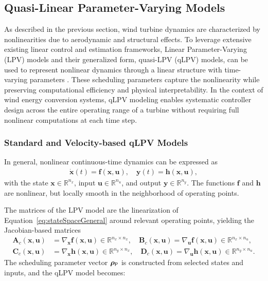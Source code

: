 \subsection{Quasi-Linear Parameter-Varying Models}
\label{sec:qLPVmodels}
As described in the previous section, wind turbine dynamics are characterized by nonlinearities due to aerodynamic and structural effects. To leverage extensive existing linear control and estimation frameworks, Linear Parameter-Varying (LPV) models and their generalized form, quasi-LPV (qLPV) models, can be used to represent nonlinear dynamics through a linear structure with time-varying parameters \cite{hoffmann2014survey}. These scheduling parameters capture the nonlinearity while preserving computational efficiency and physical interpretability. In the context of wind energy conversion systems, qLPV modeling enables systematic controller design across the entire operating range of a turbine without requiring full nonlinear computations at each time step.

\subsubsection{Standard and Velocity-based qLPV Models}
\label{sec:qLPVmodelTheory}

In general, nonlinear continuous-time dynamics can be expressed as
\begin{align} \label{eq:stateSpaceGeneral}
    \dot{\bm{x}}(t) = \bm{f}(\bm{x}, \bm{u}), \quad
    \bm{y}(t) = \bm{h}(\bm{x}, \bm{u}),
\end{align}
with the state $\bm{x} \in \mathbb{R}^{n_x}$, input $\bm{u} \in \mathbb{R}^{n_u }$, and output $\bm{y} \in \mathbb{R}^{n_y }$. The functions $\bm{f}$ and $\bm{h}$ are nonlinear, but locally smooth in the neighborhood of operating points.

The matrices of the LPV model are the linearization of Equation~\eqref{eq:stateSpaceGeneral} around relevant operating points, yielding the Jacobian-based matrices
\begin{equation}\label{eq:contMatricesqLPV}
    \begin{aligned}
        \bm{A}_c(\bm{x},\bm{u}) &= \nabla_{\bm{x}} \bm{f}(\bm{x},\bm{u}) \in \mathbb{R}^{n_x \times n_x}, \quad
        \bm{B}_c(\bm{x},\bm{u}) = \nabla_{\bm{u}} \bm{f}(\bm{x},\bm{u}) \in \mathbb{R}^{n_x \times n_u}, \\
        \bm{C}_c(\bm{x},\bm{u}) &= \nabla_{\bm{x}} \bm{h}(\bm{x},\bm{u}) \in \mathbb{R}^{n_y \times n_x}, \quad
        \bm{D}_c(\bm{x},\bm{u}) = \nabla_{\bm{u}} \bm{h}(\bm{x},\bm{u})\in \mathbb{R}^{n_y \times n_u}.
    \end{aligned}
\end{equation}
The scheduling parameter vector $\bm{\rho}_{\mathsf{P}}$ is constructed from selected states and inputs, and the qLPV model becomes:

